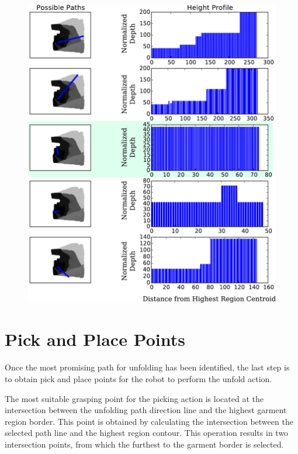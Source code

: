 \begin{figure}[thpb]
    \centering
    \includegraphics[width=\textwidth]{figures/candidate_paths.pdf}
    \caption{}
    \label{fig:paths_with_bumpiness}
\end{figure}

\section{Pick and Place Points}
\label{pick_and_place}
Once the most promising path for unfolding has been identified, the last step is to obtain pick and place points for the robot to perform the unfold action.

The most suitable grasping point for the picking action is located at the  intersection between the unfolding path direction line and the highest garment region border. This point is obtained by calculating the intersection between the selected path line and the highest region contour. This operation results in two intersection points, from which the furthest to the garment border is selected.

